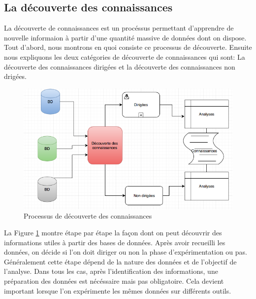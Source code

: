 \documentclass[11pt,a4paper]{report}
\begin{document}
\subsection{La découverte des connaissances}
La découverte de connaissances est un procéssus permettant d'apprendre de nouvelle informaion à partir d'une quantité massive de données dont on dispose. \\
Tout d'abord, nous montrons en quoi consiste ce processus de découverte. Ensuite nous expliquons les deux catégories de découverte de connaissances qui sont: La découverte des connaissances dirigées et la découverte des connaissances non drigées.

%
%
%
\begin{figure}[h]
\centering
\includegraphics[scale=0.50]{kddnew.png}
\caption{Processus de découverte des connaissances}
\label{figure10}
\end{figure}

La Figure \ref{figure10} montre étape par étape la façon dont on peut découvrir des informations utiles à partir des bases de données. 
Après avoir recueilli les données, on décide si l'on doit diriger ou non la phase d'expérimentation ou pas. Généralement cette étape dépend de la nature des données et de l'objectif de l'analyse. 
Dans tous les cas, après l'identification des informations, une préparation des données est nécéssaire mais pas obligatoire.  
Cela devient important lorsque l'on expérimente les mêmes données sur différents outils.
\end{document}
